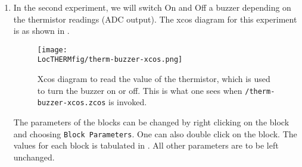 \begin{enumerate}
\item In the second experiment, we will switch On and Off a buzzer depending on the thermistor readings (ADC output). The xcos diagram for this experiment is as shown in .
  \begin{figure}
    \centering
    \texttt{[image: \\LocTHERMfig/therm-buzzer-xcos.png]}
    \caption[Xcos diagram to read the value of thermistor, which is used to turn the buzzer on or off] {Xcos diagram to read the value of the thermistor, which is used to turn the buzzer on or off.  This is what one sees when {\tt \LocTHERMscibrief/therm-buzzer-xcos.zcos} is invoked.}
    \label{fig:therm-buzzer}
  \end{figure}
The parameters of the blocks can be changed by right clicking on the block and choosing {\tt Block Parameters}. One can also double click on the block. The values for each block is tabulated in .  All other parameters are to
  be left unchanged.


\end{enumerate}

